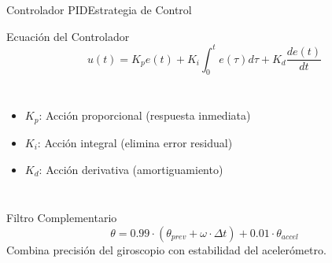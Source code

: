 \documentclass[10pt,xcolor={dvipsnames}]{beamer}
\begin{document}
\begin{frame}{Controlador PID}{Estrategia de Control}

\begin{block}{Ecuación del Controlador}
\begin{equation*}
u(t) = K_p e(t) + K_i \int_{0}^{t} e(\tau)d\tau + K_d \frac{de(t)}{dt}
\end{equation*}
\end{block}

\begin{columns}
\begin{itemize}
    \item $K_p$: Acción proporcional (respuesta inmediata)
    \item $K_i$: Acción integral (elimina error residual)
    \item $K_d$: Acción derivativa (amortiguamiento)
\end{itemize}

\begin{center}
\end{center}
\end{columns}

\vspace{0.3cm}
\begin{block}{Filtro Complementario}
\begin{equation*}
\theta = 0.99 \cdot (\theta_{prev} + \omega \cdot \Delta t) + 0.01 \cdot \theta_{accel}
\end{equation*}
Combina precisión del giroscopio con estabilidad del acelerómetro.
\end{block}
\end{frame}

\end{document}
